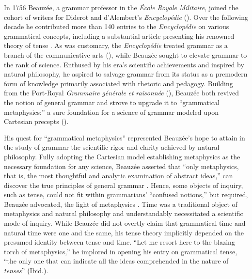\documentclass[output=paper]{langsci/langscibook}
\begin{document}
 In 1756 Beauzée, a grammar professor in the \textit{École} \textit{Royale} \textit{Militaire}, joined the cohort of writers for Diderot and d’Alembert’s \textit{Encyclopédie} (\citealt{le_guern_nicolas_2009}). Over the following decade he contributed more than 140 entries to the \textit{Encyclopédie} on various grammatical concepts, including a substantial article presenting his renowned theory of tense \citep{beauzee_tems_1765}. As was customary, the \textit{Encyclopédie} treated grammar as a branch of the communicative arts (\citealt{dalembert_systeme_1751}), while Beauzée sought to elevate grammar to the rank of science. Enthused by his era’s scientific achievements and inspired by natural philosophy, he aspired to salvage grammar from its status as a premodern form of knowledge primarily associated with rhetoric and pedagogy. Building from the Port\nobreakdash-Royal \textit{Grammaire} \textit{générale} \textit{et} \textit{raisonnée} (\citealt{arnauld_grammaire_1660}), Beauzée both revived the notion of general grammar and strove to upgrade it to “grammatical metaphysics:” a sure foundation for a science of grammar modeled upon Cartesian precepts (\citealt{chalozin-dovrat_grammar_2019}).
 
 His quest for “grammatical metaphysics” represented Beauzée’s hope to attain in the study of grammar the scientific rigor and clarity achieved by natural philosophy. Fully adopting the Cartesian model establishing metaphysics as the necessary foundation for any science, Beauzée asserted that “only metaphysics, that is, the most thoughtful and analytic examination of abstract ideas,” can discover the true principles of general grammar \citep[vol.1: xxxiij–xxxv]{beauzee_grammaire_1767}. Hence, some objects of inquiry, such as tense, could not fit within grammarians’ “confused notions,” but required, Beauzée advocated, the light of metaphysics \citep[96]{beauzee_grammaire_1767}. Time was a traditional object of metaphysics and natural philosophy and understandably necessitated a scientific mode of inquiry. While Beauzée did not overtly claim that grammatical time and natural time were one and the same, his tense theory implicitly depended on the presumed identity between tense and time. “Let me resort here to the blazing torch of metaphysics,” he implored in opening his entry on grammatical tense, “the only one that can indicate all the ideas comprehended in the nature of \textit{tenses}” (Ibid.).
 
\end{document}
